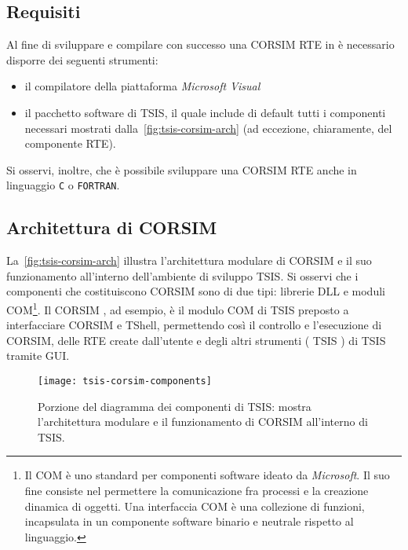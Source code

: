 \subsection{Requisiti}
Al fine di sviluppare e compilare con successo una \acs{CORSIM} \acs{RTE} in \CC{} è necessario disporre dei seguenti strumenti:
\begin{itemize}
    \item il compilatore della piattaforma \emph{Microsoft Visual \CC{}}
    \item il pacchetto software di \acs{TSIS}, il quale include di default tutti i componenti necessari mostrati dalla~\vref{fig:tsis-corsim-arch} (ad eccezione, chiaramente, del componente \acs{RTE}).
\end{itemize}
Si osservi, inoltre, che è possibile sviluppare una \acs{CORSIM} \acs{RTE} anche in linguaggio \lstinline[]|C| o \lstinline[]|FORTRAN|.

\subsection{Architettura di CORSIM}

La~\vref{fig:tsis-corsim-arch} illustra l'architettura modulare di \acs{CORSIM} e il suo funzionamento all'interno dell'ambiente di sviluppo \acs{TSIS}. Si osservi che i componenti che costituiscono \acs{CORSIM} sono di due tipi: librerie \acs{DLL} e moduli \acs{COM}\footnote{Il \acf{COM} è uno standard per componenti software ideato da \emph{Microsoft}. Il suo fine consiste nel permettere la comunicazione fra processi e la creazione dinamica di oggetti. Una interfaccia \acs{COM} è una collezione di funzioni, incapsulata in un componente software binario e neutrale rispetto al linguaggio.}. Il \acs{CORSIM} , ad esempio, è il modulo \acs{COM} di \acs{TSIS} preposto a interfacciare \acs{CORSIM} e \acs{TShell}, permettendo così il controllo e l'esecuzione di \acs{CORSIM}, delle \acs{RTE} create dall'utente e degli altri strumenti (\eg{} \acs{TSIS} ) di \acs{TSIS} tramite \acs{GUI}.

\begin{figure}
\centering
\texttt{[image: tsis-corsim-components]}
\caption[Diagramma dei componenti di \acs{CORSIM}]{Porzione del diagramma dei componenti di \acs{TSIS}: mostra l'architettura modulare e il funzionamento di \acs{CORSIM} all'interno di \acs{TSIS}.}
\label{fig:tsis-corsim-arch}
\end{figure}

